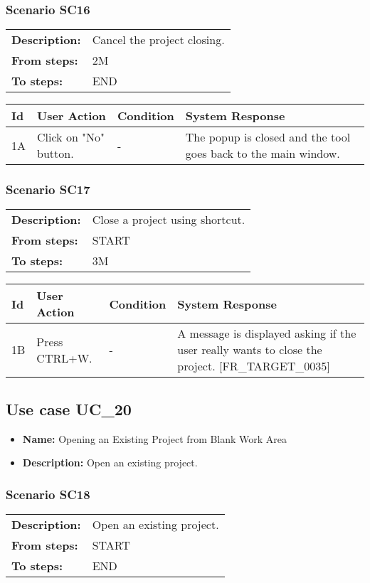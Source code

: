 \documentclass[a4paper,11pt]{article}
\newcommand{\bl}{\\ \hline}
\begin{document}
\subsubsection*{Scenario SC16}
\begin{tabular}{p{1in}p{4in}}
{\bf Description:} & Cancel the project closing. \\
{\bf From steps:} & 2M \\
{\bf To steps:} & END \\
\end{tabular}
 
\begin{tabular}{|p{0.8in}|p{1.6in}|p{1.6in}|p{1.6in}|}
\hline
Id & User Action & Condition & System Response  \bl 
1A & Click on "No" button. & - & The popup is closed and the tool goes back to the main
						window. \bl 
\end{tabular}
\subsubsection*{Scenario SC17}
\begin{tabular}{p{1in}p{4in}}
{\bf Description:} & Close a project using shortcut. \\
{\bf From steps:} & START \\
{\bf To steps:} & 3M \\
\end{tabular}
 
\begin{tabular}{|p{0.8in}|p{1.6in}|p{1.6in}|p{1.6in}|}
\hline
Id & User Action & Condition & System Response  \bl 
1B & Press CTRL+W. & - & A message is displayed asking if the user really wants to
						close the project. [FR_TARGET_0035] \bl 
\end{tabular}
\subsection*{Use case UC_20}
\begin{itemize}
\item {\bf Name: }Opening an Existing Project from Blank Work Area
\item {\bf Description: }Open an existing project.
\end{itemize}
\subsubsection*{Scenario SC18}
\begin{tabular}{p{1in}p{4in}}
{\bf Description:} & Open an existing project. \\
{\bf From steps:} & START \\
{\bf To steps:} & END \\
\end{tabular}
 
\end{document}
